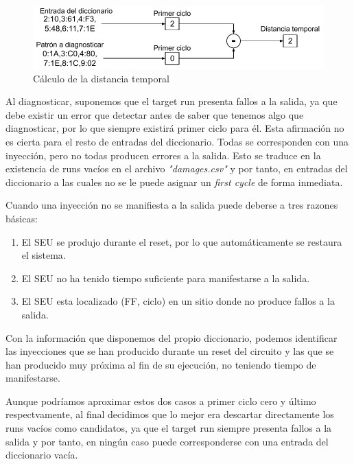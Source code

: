 \begin{figure}[htbp]
    \centering
    \includegraphics[width=0.95\linewidth]
    {Cycle/figuras/fig51.pdf}
    \caption{Cálculo de la distancia temporal}
    \label{fig:CycDist}
\end{figure}

Al diagnosticar, suponemos que el target run presenta fallos a la salida, ya que
debe existir un error que detectar antes de saber que tenemos algo que
diagnosticar, por lo que siempre existirá primer ciclo para él. Esta afirmación no
es cierta para el resto de entradas del diccionario. Todas se corresponden con una
inyección, pero no todas producen errores a la salida. Esto se traduce en la
existencia de runs vacíos en el archivo \textit{"damages.csv"} y por tanto, en
entradas del diccionario a las cuales no se le puede asignar un \textit{first
cycle} de forma inmediata.

Cuando una inyección no se manifiesta a la salida puede deberse a tres razones
básicas:
\begin{enumerate}
    \item El \gls{SEU} se produjo durante el reset, por lo que automáticamente se
        restaura el sistema.
    \item El \gls{SEU} no ha tenido tiempo suficiente para manifestarse a la
        salida.
    \item El \gls{SEU} esta localizado (FF, ciclo) en un sitio donde no produce
        fallos a la salida.
\end{enumerate}
Con la información que disponemos del propio diccionario, podemos identificar las
inyecciones que se han producido durante un reset del circuito y las que  se han
producido muy próxima al fin de su ejecución, no teniendo tiempo de manifestarse.

Aunque podríamos aproximar estos dos casos a primer ciclo cero y último
respectvamente, al final decidimos que lo mejor era descartar directamente los
runs vacíos como candidatos, ya que el target run siempre presenta fallos a la
salida y por tanto, en ningún caso puede corresponderse con una entrada del
diccionario vacía.

